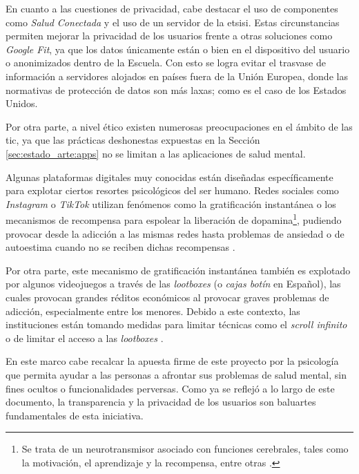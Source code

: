     En cuanto a las cuestiones de privacidad, cabe destacar el uso de componentes como \textit{Salud Conectada} y el uso de un servidor de la \gls{etsisi}. Estas circunstancias permiten mejorar la privacidad de los usuarios frente a otras soluciones como \textit{Google Fit}, ya que los datos únicamente están o bien en el dispositivo del usuario o anonimizados dentro de la Escuela.  Con esto se logra evitar el trasvase de información a servidores alojados en países fuera de la Unión Europea, donde las normativas de protección de datos son más laxas; como es el caso de los Estados Unidos. 

    Por otra parte, a nivel ético existen numerosas preocupaciones en el ámbito de las \gls{tic}, ya que las prácticas deshonestas expuestas en la Sección \ref{sec:estado_arte:apps} no se limitan a las aplicaciones de salud mental.
    
    Algunas plataformas digitales muy conocidas están diseñadas específicamente para explotar ciertos resortes psicológicos del ser humano. Redes sociales como \textit{Instagram} o \textit{TikTok} utilizan fenómenos como la gratificación instantánea o los mecanismos de recompensa \cite{noauthor_dopamina_2022} para espolear la liberación de dopamina\footnote{Se trata de un neurotransmisor asociado con funciones cerebrales, tales como la motivación, el aprendizaje y la recompensa, entre otras \cite{gil_que_2023}.}, pudiendo provocar desde la adicción a las mismas redes %
    hasta problemas de ansiedad o de autoestima cuando no se reciben dichas recompensas \cite{ina_impacto_2023}.
    
    Por otra parte, este mecanismo de gratificación instantánea también es explotado por algunos videojuegos a través de las \textit{lootboxes} (o \textit{cajas botín} en Español), las cuales provocan grandes réditos económicos al provocar graves problemas de adicción, especialmente entre los menores. Debido a este contexto, las instituciones están tomando medidas para limitar técnicas como el \textit{scroll infinito} \cite{alconchel_prohibir_2023} o de limitar el acceso a las \textit{lootboxes} \cite{ministerio_de_derechos_sociales_consumo_y_agenda_2030_ministerio_2024} \cite{garcia_espanda_2024}. 
    
    En este marco cabe recalcar la apuesta firme de este proyecto por la psicología que permita ayudar a las personas a afrontar sus problemas de salud mental, sin fines ocultos o funcionalidades perversas. Como ya se reflejó a lo largo de este documento, la transparencia y la privacidad de los usuarios son baluartes fundamentales de esta iniciativa.

